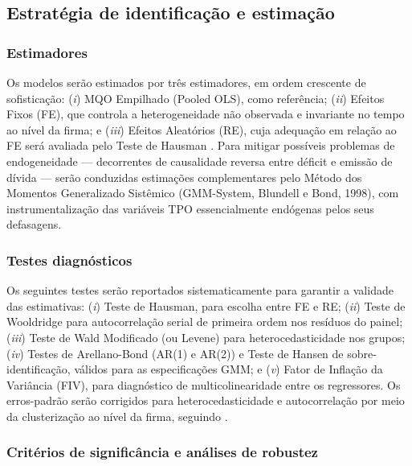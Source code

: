 \documentclass[a4paper,12pt]{article}
\begin{document}
\subsection{Estratégia de identificação e estimação}
 
\subsubsection{Estimadores}
 
Os modelos serão estimados por três estimadores, em ordem crescente de sofisticação: (\textit{i}) MQO Empilhado (Pooled OLS), como referência; (\textit{ii}) Efeitos Fixos (FE), que controla a heterogeneidade não observada e invariante no tempo ao nível da firma; e (\textit{iii}) Efeitos Aleatórios (RE), cuja adequação em relação ao FE será avaliada pelo Teste de Hausman \cite{Yildirim2021}. Para mitigar possíveis problemas de endogeneidade — decorrentes de causalidade reversa entre déficit e emissão de dívida — serão conduzidas estimações complementares pelo Método dos Momentos Generalizado Sistêmico (GMM-System, Blundell e Bond, 1998), com instrumentalização das variáveis TPO essencialmente endógenas pelos seus defasagens.
 
\subsubsection{Testes diagnósticos}
 
Os seguintes testes serão reportados sistematicamente para garantir a validade das estimativas: (\textit{i}) Teste de Hausman, para escolha entre FE e RE; (\textit{ii}) Teste de Wooldridge para autocorrelação serial de primeira ordem nos resíduos do painel; (\textit{iii}) Teste de Wald Modificado (ou Levene) para heterocedasticidade nos grupos; (\textit{iv}) Testes de Arellano-Bond (AR(1) e AR(2)) e Teste de Hansen de sobre-identificação, válidos para as especificações GMM; e (\textit{v}) Fator de Inflação da Variância (FIV), para diagnóstico de multicolinearidade entre os regressores. Os erros-padrão serão corrigidos para heterocedasticidade e autocorrelação por meio da clusterização ao nível da firma, seguindo \cite{Yildirim2021}.
 
\subsubsection{Critérios de significância e análises de robustez}
 
\end{document}
